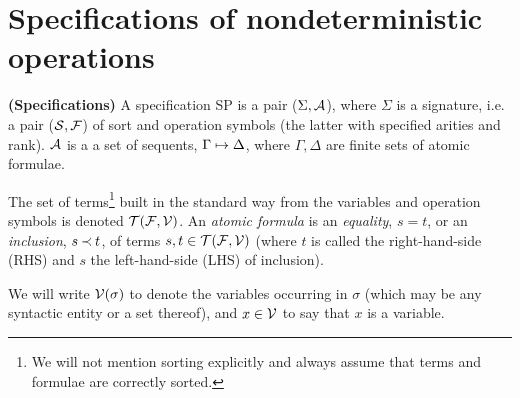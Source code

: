 

\section{Specifications of nondeterministic operations}\label{se:specs}

\begin{DEFINITION} {\bf (Specifications)} \label{de:terms-vars-forms}
A specification SP is a pair ($\Sigma,{\cal {A}}$), where $\Sigma$ is a signature, i.e.
a pair (${\cal S},{\cal F}$) of sort and operation symbols (the latter with specified
arities and rank). ${\cal {A}}$ is a a set of sequents, $\Gamma\mathrel{\mapsto}\Delta$, 
where $\Gamma, \Delta$ are finite sets of atomic formulae.

The set of terms\footnote{We will not mention sorting explicitly
and always assume that terms and formulae are correctly sorted.}
 built in the standard way from the variables and
operation symbols is denoted ${\cal T}({\cal F},\mbox{$\cal V$})$. An {\em atomic formula} 
is an {\em equality}, $s=t$, or an {\em inclusion}, $s\mathbin{\prec} t$, of terms
$s,t\in{\cal T}({\cal F},{\cal V})$ (where $t$ is called the 
right-hand-side (RHS) and $s$ the left-hand-side (LHS) of inclusion).
\end{DEFINITION}
\noindent
We will write $\mbox{$\cal V$}(\sigma)$ to denote the variables occurring in $\sigma$ 
(which may be any syntactic entity or a set thereof), and $x\in{\cal V}$ to say that
$x$ is a variable.

